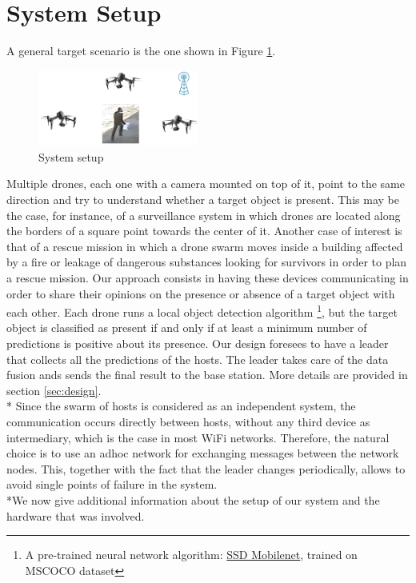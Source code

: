 \documentclass[10pt,conference,compsocconf]{IEEEtran}
\begin{document}
\section{System Setup}
A general target scenario is the one shown in Figure \ref{fig:setup}.
\begin{figure}[h!]
	\centering
	\includegraphics[width=0.47\textwidth]{img/setup.png}
	\caption{System setup}
	\label{fig:setup}
\end{figure}
Multiple drones, each one with a camera mounted on top of it, point to the same direction and try to understand whether a target object is present. This may be the case, for instance, of a surveillance system in which drones are located along the borders of a square point towards the center of it. Another case of interest is that of a rescue mission in which a drone swarm moves inside a building affected by a fire or leakage of dangerous substances looking for survivors in order to plan a rescue mission. Our approach consists in having these devices communicating in order to share their opinions on the presence or absence of a target object with each other. Each drone runs a local object detection algorithm \footnote{A pre-trained neural network algorithm: \href{https://github.com/tensorflow/models/blob/master/research/object\_detection/g3doc/detection_model_zoo.md}{SSD Mobilenet}, trained on MSCOCO dataset}, but the target object is classified as present if and only if at least a minimum number of predictions is positive about its presence. Our design foresees to have a leader that collects all the predictions of the hosts. The leader takes care of the data fusion ands sends the final result to the base station. More details are provided in section \ref{sec:design}.\\*
Since the swarm of hosts is considered as an independent system, the communication occurs directly between hosts, without any third device as intermediary, which is the case in most WiFi networks. Therefore, the natural choice is to use an adhoc network for exchanging messages between the network nodes. This, together with the fact that the leader changes periodically, allows to avoid single points of failure in the system.
\\*We now give additional information about the setup of our system and the hardware that was involved.
\end{document}
